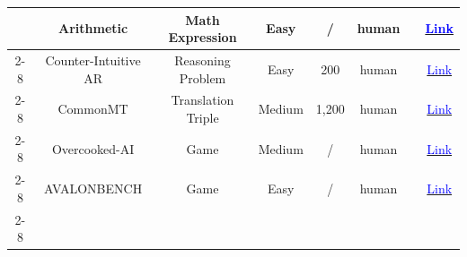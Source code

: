 \begin{table}[!htp]
{\begin{tabular}{c|c|c|c|c|c|c|c}
                                                                                  & Arithmetic             & Math Expression         & Easy                & /                & human               & \cite{du2023improving}                                                                                                                                                          & \href{https://github.com/composable-models/llm_multiagent_debate}{\textcolor{blue}{Link}}                                                                         \\ \cline{2-8}
                                                                                  & Counter-Intuitive AR   & Reasoning Problem       & Easy                & 200              & human               & \cite{liang2023encouraging}                                                                                                                                                     & \href{https://github.com/Skytliang/Multi-Agents-Debate}{\textcolor{blue}{Link}}                                                                                   \\ \cline{2-8}
                                                                                  & CommonMT               & Translation Triple      & Medium              & 1,200            & human               & \cite{liang2023encouraging}                                                                                                                                                     & \href{https://github.com/tjunlp-lab/CommonMT}{\textcolor{blue}{Link}}                                                                                             \\ \cline{2-8}
                                                                                & Overcooked-AI          & Game                    & Medium              & /                & human               & \cite{zhang2024towards}                                                                                                                                                         & \href{https://github.com/HumanCompatibleAI/overcooked_ai}{\textcolor{blue}{Link}}                                                                                 \\ \cline{2-8}
                                                                                  & AVALONBENCH            & Game                    & Easy                & /                & human               & \cite{light2023text}                                                                                                                                                            & \href{https://github.com/jonathanmli/Avalon-LLM}{\textcolor{blue}{Link}}                                                                                          \\ \cline{2-8}

\end{tabular}}
\end{table}
